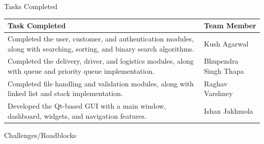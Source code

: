 \documentclass[12pt,a4paper]{article}
\newcommand{\sectiontitle}[1]{%
    {\color{GEUBlue}
    \fontsize{18}{22}\selectfont #1}
}
\newcommand{\instruction}[1]{%
    {\color{InstructionGrey}
    \fontsize{10.5}{13}\selectfont #1}
}
\begin{document}
\newpage




\sectiontitle{Tasks Completed}

\vspace{0.05cm}

\begin{tabularx}{\textwidth}{
|>{\raggedright\arraybackslash}X
|>{\raggedright\arraybackslash}X|
}
\hline
\textbf{Task Completed} & \textbf{Team Member}\\
\hline

Completed the user, customer, and authentication modules, along with searching, sorting, and binary search algorithms.
&
Kush Agarwal\\
\hline

Completed the delivery, driver, and logistics modules, along with queue and priority queue implementation.
&
Bhupendra Singh Thapa\\
\hline

Completed file handling and validation modules, along with linked list and stack implementation.
&
Raghav Varshney\\
\hline

Developed the Qt-based GUI with a main window, dashboard, widgets, and navigation features.
&
Ishan Jakhmola\\
\hline

\end{tabularx}

\vspace{0.65cm}

\sectiontitle{Challenges/Roadblocks }

\vspace{0.05cm}

\instruction{

}

\vspace{0.18cm}
\end{document}

